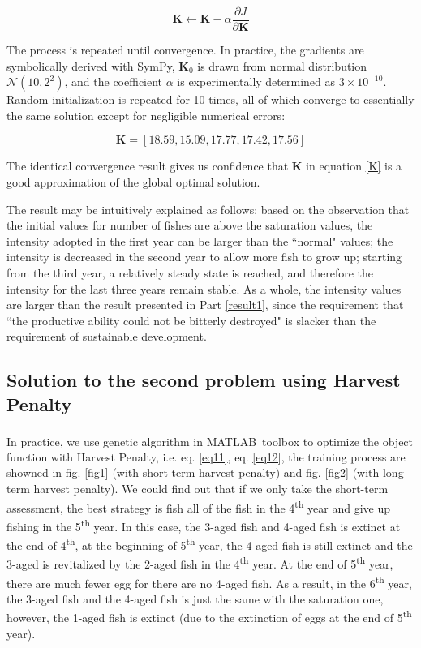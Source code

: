 \documentclass{IEEEtran}
\begin{document}
$$\boldsymbol{K}\leftarrow \boldsymbol{K} - \alpha \frac{\partial J}{\partial \boldsymbol{K}}$$

The process is repeated until convergence. In practice, the gradients are symbolically derived with SymPy, $\boldsymbol{K}_0$ is drawn from normal distribution $\mathcal{N}(10, 2^2)$, and the coefficient $\alpha$ is experimentally determined as $3\times 10^{-10}$. Random initialization is repeated for 10 times, all of which converge to essentially the same solution except for negligible numerical errors:

\begin{equation}\label{K}\boldsymbol{K} = [18.59, 15.09, 17.77, 17.42, 17.56]\end{equation}

The identical convergence result gives us confidence that $\boldsymbol{K}$ in equation \ref{K} is a good approximation of the global optimal solution.

The result may be intuitively explained as follows: based on the observation that the initial values for number of fishes are above the saturation values, the intensity adopted in the first year can be larger than the ``normal" values; the intensity is decreased in the second year to allow more fish to grow up; starting from the third year, a relatively steady state is reached, and therefore the intensity for the last three years remain stable. As a whole, the intensity values are larger than the result presented in Part \ref{result1}, since the requirement that ``the productive ability could not be bitterly destroyed" is slacker than the requirement of sustainable development.


\subsection{Solution to the second problem using Harvest Penalty}

In practice, we use genetic algorithm in MATLAB\textsuperscript\textregistered \ toolbox to optimize the object function with Harvest Penalty, i.e. eq. \ref{eq11}, eq. \ref{eq12}, the training process are showned in fig. \ref{fig1} (with short-term harvest penalty) and fig. \ref{fig2} (with long-term harvest penalty). We could find out that if we only take the short-term assessment, the best strategy is fish all of the fish in the 4\textsuperscript{th} year and give up fishing in the 5\textsuperscript{th} year. In this case, the 3-aged fish and 4-aged fish is extinct at the end of 4\textsuperscript{th}, at the beginning of 5\textsuperscript{th} year, the 4-aged fish is still extinct and the 3-aged is revitalized by the 2-aged fish in the 4\textsuperscript{th} year. At the end of 5\textsuperscript{th} year, there are much fewer egg for there are no 4-aged fish. As a result, in the 6\textsuperscript{th} year, the 3-aged fish and the 4-aged fish is just the same with the saturation one, however, the 1-aged fish is extinct (due to the extinction of eggs at the end of 5\textsuperscript{th} year). 
\end{document}

